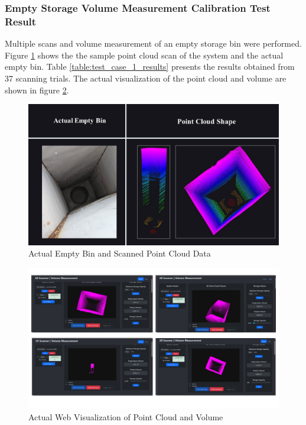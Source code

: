 \subsubsection{Empty Storage Volume Measurement Calibration Test Result}
Multiple scans and volume measurement of an empty storage bin were performed. Figure \ref{ch4:fig:empty-bin-point-cloud} shows the the sample point cloud scan of the system and the actual empty bin. Table \ref{table:test_case_1_results} presents the results obtained from 37 scanning trials. The actual visualization of the point cloud and volume are shown in figure \ref{ch4:fig:web-point-cloud-and-volume}. \\

\begin{figure}[H]
	\centering
	\includegraphics[width=1\textwidth]{Figures/empty-bin-point-cloud}
	\caption{Actual Empty Bin and Scanned Point Cloud Data}
	\label{ch4:fig:empty-bin-point-cloud}
\end{figure}

\begin{figure}[H]
	\centering
	\includegraphics[width=1\textwidth]{Figures/web-point-cloud-and-volume-1}
	\caption{Actual Web Visualization of Point Cloud and Volume}
	\label{ch4:fig:web-point-cloud-and-volume}
\end{figure}

